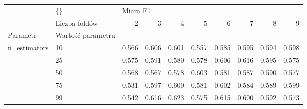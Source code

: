 \begin{tabular}{llrrrrrrrr}
\hline
             & \{\} & \multicolumn{8}{l}{Miara F1} \\
             & Liczba foldów &        2 &      3 &      4 &      5 &      6 &      7 &      8 &      9 \\
Parametr & Wartość parametru &          &        &        &        &        &        &        &        \\
\hline
n\_estimators & 10 &    0.566 &  0.606 &  0.601 &  0.557 &  0.585 &  0.595 &  0.594 &  0.598 \\
             & 25 &    0.575 &  0.591 &  0.580 &  0.578 &  0.606 &  0.616 &  0.595 &  0.575 \\
             & 50 &    0.568 &  0.567 &  0.578 &  0.603 &  0.581 &  0.587 &  0.590 &  0.577 \\
             & 75 &    0.531 &  0.597 &  0.600 &  0.581 &  0.602 &  0.584 &  0.589 &  0.599 \\
             & 99 &    0.542 &  0.616 &  0.623 &  0.575 &  0.615 &  0.600 &  0.592 &  0.573 \\
\hline
\end{tabular}
